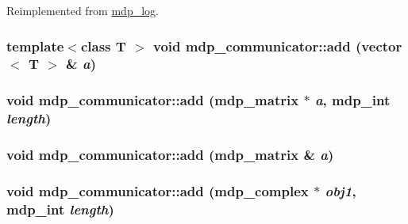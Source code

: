 Reimplemented from \hyperlink{classmdp__log_a0e85794c9c7fdaf944eb70d1f2c0ecc5}{mdp\_\-log}.\hypertarget{classmdp__communicator_ab3a9834d788e57d08c705453088a44f5}{
\subsubsection[{add}]{\setlength{\rightskip}{0pt plus 5cm}template$<$class T $>$ void mdp\_\-communicator::add (vector$<$ T $>$ \& {\em a})}}
\label{classmdp__communicator_ab3a9834d788e57d08c705453088a44f5}
\hypertarget{classmdp__communicator_a03e473c3c953f458504fb21872a2a244}{
\subsubsection[{add}]{\setlength{\rightskip}{0pt plus 5cm}void mdp\_\-communicator::add ({\bf mdp\_\-matrix} $\ast$ {\em a}, \/  {\bf mdp\_\-int} {\em length})}}
\label{classmdp__communicator_a03e473c3c953f458504fb21872a2a244}
\hypertarget{classmdp__communicator_a5e533ae9ef363e9e39dfc9f788aeab19}{
\subsubsection[{add}]{\setlength{\rightskip}{0pt plus 5cm}void mdp\_\-communicator::add ({\bf mdp\_\-matrix} \& {\em a})}}
\label{classmdp__communicator_a5e533ae9ef363e9e39dfc9f788aeab19}
\hypertarget{classmdp__communicator_aa5349744a5384adbbdd3cf7dc2a5b95a}{
\subsubsection[{add}]{\setlength{\rightskip}{0pt plus 5cm}void mdp\_\-communicator::add ({\bf mdp\_\-complex} $\ast$ {\em obj1}, \/  {\bf mdp\_\-int} {\em length})}}
